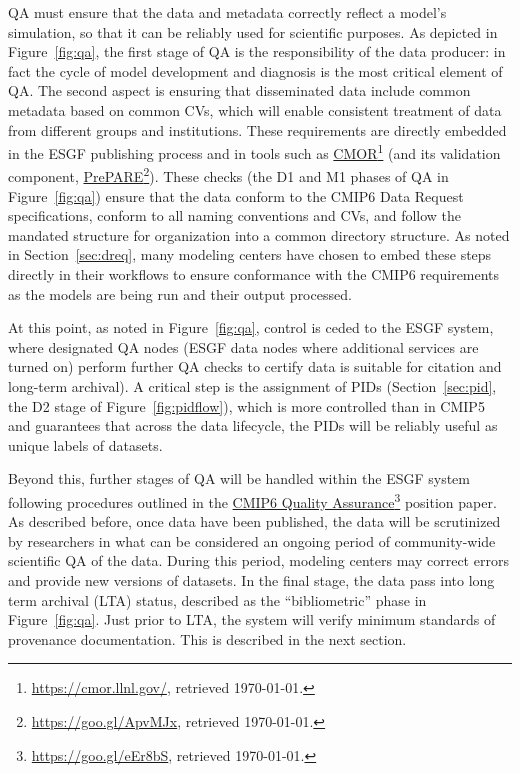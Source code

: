 \documentclass[gmd,manuscript]{copernicus}
\newcommand{\urlref}[2] {\href{#1}{#2}\footnote{\url{#1}, retrieved \today.}}
\begin{document}
QA must ensure that the data and metadata correctly reflect a model's
simulation, so that it can be reliably used for scientific purposes.
As depicted in Figure~\ref{fig:qa}, the first stage of QA is the
responsibility of the data producer: in fact the cycle of model
development and diagnosis is the most critical element of QA. The
second aspect is ensuring that disseminated data include common
metadata based on common CVs, which will enable consistent treatment
of data from different groups and institutions. These requirements are
directly embedded in the ESGF publishing process and in tools such as
\urlref{https://cmor.llnl.gov/}{CMOR} (and its validation component,
\urlref{https://goo.gl/ApvMJx}{PrePARE}). These checks (the D1 and M1
phases of QA in Figure~\ref{fig:qa}) ensure that the data conform to
the CMIP6 Data Request specifications, conform to all naming
conventions and CVs, and follow the mandated structure for
organization into a common directory structure. As noted in
Section~\ref{sec:dreq}, many modeling centers have chosen to embed
these steps directly in their workflows to ensure conformance with the
CMIP6 requirements as the models are being run and their output processed.

At this point, as noted in Figure~\ref{fig:qa}, control is ceded to
the ESGF system, where designated QA nodes 
(ESGF data nodes where additional services are turned on) 
perform further QA checks to certify data is suitable 
 for citation and long-term archival). 
 A critical step is the assignment of PIDs
(Section~\ref{sec:pid}, the D2 stage of Figure~\ref{fig:pidflow}),
which is more controlled than in CMIP5 and guarantees that across the
data lifecycle, the PIDs will be reliably useful as unique labels of
datasets.

Beyond this, further stages of QA will be handled within the ESGF
system following procedures outlined in the
\urlref{https://goo.gl/eEr8bS}{CMIP6 Quality Assurance} position
paper. As described before, once data have been published, the data
will be scrutinized by researchers in what can be considered an
ongoing period of community-wide scientific QA of the data. During
this period, modeling centers may correct errors and provide new
versions of datasets. In the final stage, the data pass into long term
archival (LTA) status, described as the ``bibliometric'' phase in
Figure~\ref{fig:qa}. Just prior to LTA, the system will verify minimum
standards of provenance documentation. This is described in the next
section.
\end{document}
